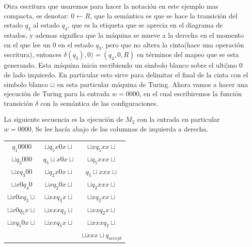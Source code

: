 \documentclass[10pt]{report}
\begin{document}
    Otra escritura que usaremos para hacer la notación en este ejemplo mas compacta,
    es denotar: $0\leftarrow R$, que la semántica es que se hace la transición del estado $q_{3}$ al estado $q_{4}$, que
    es la etiqueta que se aprecia en el diagrama de estados, y ademas significa que la máquina se mueve a la derecha en
    el momento en el que lee un $0$ en el estado $q_{3}$, pero que no altera la cinta(\no hace una operación escritura),
    entonces $\delta(q_{3}),0) = (q_{4},0,R)$ en términos del mapeo que se esta generando.
    Esta máquina inicia escribiendo un simbolo blanco sobre el ulti|mo $0$ de lado izquierdo. En particular esto sirve
    para delimitar el final de la cinta con el simbolo blanco $\sqcup$ en esta particular máquina de Turing.
    \space
    Ahora vamos a hacer una ejecución de Turing para la entrada $w = 0000$, en el cual escribiremos la función
    transición $\delta$ con la semántica de las configuraciones.
    
    La siguiente secuencia es la ejecución de $M_{2}$ con la entrada en particular $w = 0000$,
    Se lee hacía abajo de las columnas de izquierda a derecha.

    \begin{center}
        \begin{tabular}{c c c}
            $q_{1}0000$ &     $\sqcup q_{5}x0x\sqcup$ & $\sqcup xq_{5}xx\sqcup$ \\
            $\sqcup q_{2}000$ & $q_{5}\sqcup x0x\sqcup$ & $\sqcup q_{5}xxx\sqcup$\\
            $\sqcup xq_{3}00$ & $\sqcup q_{2}x0x\sqcup$ & $q_{5}\sqcup xxx\sqcup$\\
            $\sqcup x0q_{4}0$  & $\sqcup xq_{2}0x\sqcup$ &   $\sqcup q_{2}xxx\sqcup$\\
            $\sqcup x0xq_{3}\sqcup$ & $\sqcup xxq_{3}x\sqcup$ & $\sqcup xq_{2}xx\sqcup$ \\
            $\sqcup x0q_{5}x\sqcup$ & $\sqcup xxxq_{3}\sqcup$ & $\sqcup xxq_{2}x\sqcup$ \\
            $\sqcup xq_{5}0x\sqcup$ & $\sqcup xxq_{5}x\sqcup$ & $\sqcup xxxq_{2}\sqcup$ \\
                            &                                 & $\sqcup xxx\sqcup q_{accept}$ \\
        \end{tabular}
    \end{center}


\end{document}

